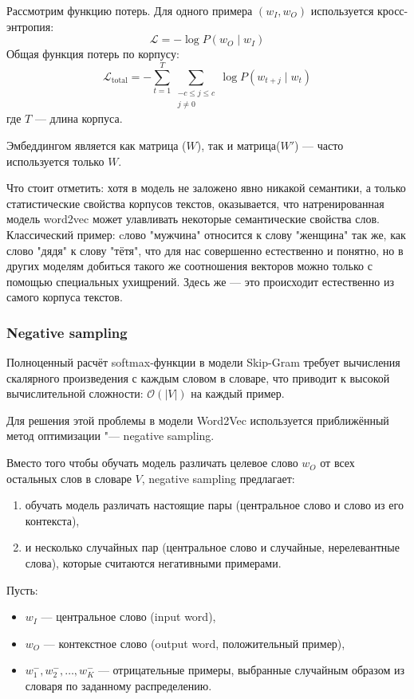 \documentclass[coursework]{SCWorks}
\begin{document}
Рассмотрим функцию потерь.
Для одного примера $(w_I, w_O)$ используется кросс-энтропия:
\[
\mathcal{L} = -\log P(w_O \mid w_I)
\]
Общая функция потерь по корпусу:
\[
\mathcal{L}_{\text{total}} = -\sum_{t=1}^{T} \sum_{\substack{-c \leq j \leq c \\ j \ne 0}} \log P(w_{t+j} \mid w_t)
\]
где $T$ — длина корпуса.

Эмбеддингом является как матрица ($W$), так и матрица($W'$) — часто используется только $W$. 

Что стоит отметить: хотя в модель не заложено явно никакой семантики, а только статистические свойства корпусов текстов, оказывается, что натренированная модель word2vec может улавливать некоторые семантические свойства слов. Классический пример: cлово "мужчина" относится к слову "женщина" так же, как слово "дядя" к слову "тётя", что для нас совершенно естественно и понятно, но в других моделям добиться такого же соотношения векторов можно только с помощью специальных ухищрений. Здесь же — это происходит естественно из самого корпуса текстов.

\subsubsection{Negative sampling}
Полноценный расчёт softmax-функции в модели Skip-Gram требует вычисления скалярного произведения с каждым словом в словаре, что приводит к высокой вычислительной сложности: $\mathcal{O}(|V|)$ на каждый пример.

Для решения этой проблемы в модели Word2Vec используется приближённый метод оптимизации "--- negative sampling.

Вместо того чтобы обучать модель различать целевое слово $w_O$ от всех остальных слов в словаре $V$, negative sampling предлагает:
\begin{enumerate}
  \item обучать модель различать настоящие пары (центральное слово и слово из его контекста),
  \item и несколько случайных пар (центральное слово и случайные, нерелевантные слова), которые считаются негативными примерами.
\end{enumerate}

Пусть:
\begin{itemize}
  \item $w_I$ — центральное слово (input word),
  \item $w_O$ — контекстное слово (output word, положительный пример),
  \item $w_1^-, w_2^-, \dots, w_K^-$ — отрицательные примеры, выбранные случайным образом из словаря по заданному распределению.
\end{itemize}
\end{document}
